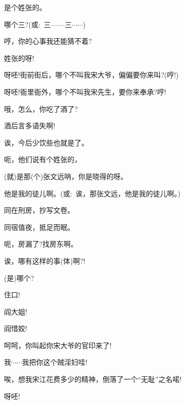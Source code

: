 {

{是个姓张的。}

{哪个三?(或:~三------三$\cdots{}\cdots{}$)}

{哼，你的心事我还能猜不着?}

{姓张的呀!}

{呀呸!街前街后，哪个不叫我宋大爷，偏偏要你来叫?(哼!)}

{呀呸!衙里衙外，哪个不叫我宋先生，要你来奉承?哼!}

{哦，怎么，你吃了酒了?}

{酒后言多语失啊!}

{诶，今后少饮些也就是了。}

{呃，他们说有个姓张的，}

{(就)是那(个)张文远呐，你是晓得的呀。}

{他是我的徒儿啊。(或:~诶，那张文远，他是我的徒儿啊。)}

{同在刑房，抄写文卷。}

{同宿值夜，抵足而眠。}

{呃，房漏了?找房东啊。}

{诶，哪有这样的事(体)啊?!}

{(是)哪个?}\hspace{10pt}~

{住口!}\hspace{20pt}~


{阎大姐!}\hspace{10pt}~

{阎惜姣!}\hspace{10pt}~

{呵呵，你叫起你宋大爷的官印来了!}

{我$\cdots{}\cdots{}$我把你这个贼淫妇哇!}

{唉，想我宋江花费多少的精神，倒落了一个``无耻''之名喏!}


{呀呸!}\hspace{20pt}~


}
